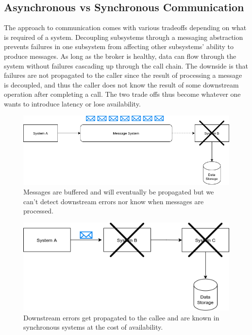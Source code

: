 \documentclass[11pt]{article}
\begin{document}
\subsection{Asynchronous vs Synchronous Communication}

The approach to communication comes with various tradeoffs depending on what is required of a system. Decoupling subsystems through a messaging abstraction prevents failures in one subsystem from affecting other subsystems' ability to produce messages. As long as the broker is healthy, data can flow through the system without failures cascading up through the call chain.
\newline
\newline
The downside is that failures are not propagated to the caller since the result of processing a message is decoupled, and thus the caller does not know the result of some downstream operation after completing a call. The two trade offs thus become whatever one wants to introduce latency or lose availability.

\vspace{15pt}
\begin{figure}[htbp]
\centerline{\includegraphics[scale=0.5]{assets/buffered.png}}
\caption{ Messages are buffered and will eventually be propagated but we can't detect downstream errors nor know when messages are processed.}
\label{fig}
\end{figure}

\begin{figure}[htbp]
\centerline{\includegraphics[scale=0.5]{assets/sync.png}}
\caption{Downstream errors get propagated to the callee and are known in synchronous systems at the cost of availability.}
\label{fig}
\end{figure}
\vspace{15pt}
\end{document}
